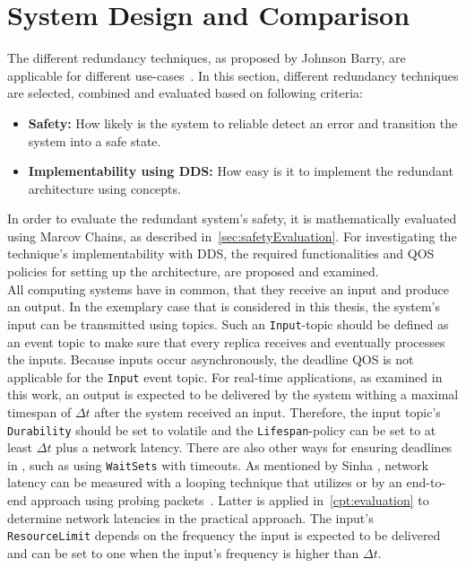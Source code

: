 
\section{System Design and Comparison}
The different redundancy techniques, as proposed by Johnson Barry, are applicable for different use-cases~\cite{BarryFaultToleranceAnalysis}.
In this section, different redundancy techniques are selected, combined and evaluated based on following criteria:

\begin{itemize}
\item \textbf{Safety:} How likely is the system to reliable detect an error and transition the system into a safe state.
\item \textbf{Implementability using \gls*{DDS}:} How easy is it to implement the redundant architecture using  concepts.
\end{itemize}

In order to evaluate the redundant system's safety, it is mathematically evaluated using Marcov Chains, as described in~\autoref{sec:safetyEvaluation}.
For investigating the technique's implementability with \gls*{DDS}, the required functionalities and \gls*{QOS} policies for setting up the architecture, are proposed and examined.
\\

All computing systems have in common, that they receive an input and produce an output.
In the exemplary case that is considered in this thesis, the system's input can be transmitted using  topics.
Such an \texttt{Input}-topic should be defined as an event topic to make sure that every replica receives and eventually processes the inputs.
Because inputs occur asynchronously, the deadline \gls*{QOS} is not applicable for the \texttt{Input} event topic.
For real-time applications, as examined in this work, an output is expected to be delivered by the system withing a maximal timespan of $\Delta t$ after the system received an input.
Therefore, the input topic's \texttt{Durability} should be set to volatile and the \texttt{Lifespan}-policy can be set to at least $\Delta t$ plus a network latency.
There are also other ways for ensuring deadlines in , such as using \texttt{WaitSets} with timeouts.
As mentioned by Sinha \etal, network latency can be measured with a looping technique that utilizes   or by an end-to-end approach using probing packets~\cite{SinhaMeasureNetworkLatency}.
Latter is applied in~\autoref{cpt:evaluation} to determine network latencies in the practical approach.
The input's \texttt{ResourceLimit} depends on the frequency the input is expected to be delivered and can be set to one when the input's frequency is higher than $\Delta t$.
\\

